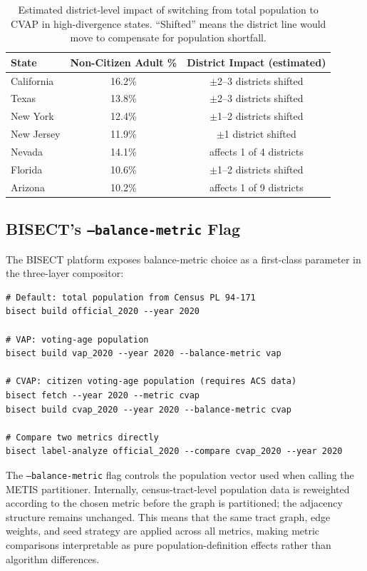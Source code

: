 \begin{table}[h]
\centering
\begin{tabular}{lcc}
\toprule
\textbf{State} & \textbf{Non-Citizen Adult \%} & \textbf{District Impact (estimated)} \\
\midrule
California & 16.2\% & $\pm$2--3 districts shifted \\
Texas & 13.8\% & $\pm$2--3 districts shifted \\
New York & 12.4\% & $\pm$1--2 districts shifted \\
New Jersey & 11.9\% & $\pm$1 district shifted \\
Nevada & 14.1\% & affects 1 of 4 districts \\
Florida & 10.6\% & $\pm$1--2 districts shifted \\
Arizona & 10.2\% & affects 1 of 9 districts \\
\bottomrule
\end{tabular}
\caption{Estimated district-level impact of switching from total population to CVAP in high-divergence states. ``Shifted'' means the district line would move to compensate for population shortfall.}
\label{tab:district-impact}
\end{table}

\subsection{BISECT's \texttt{--balance-metric} Flag}

The BISECT platform exposes balance-metric choice as a first-class parameter in the three-layer compositor:

\begin{verbatim}
# Default: total population from Census PL 94-171
bisect build official_2020 --year 2020

# VAP: voting-age population
bisect build vap_2020 --year 2020 --balance-metric vap

# CVAP: citizen voting-age population (requires ACS data)
bisect fetch --year 2020 --metric cvap
bisect build cvap_2020 --year 2020 --balance-metric cvap

# Compare two metrics directly
bisect label-analyze official_2020 --compare cvap_2020 --year 2020
\end{verbatim}

The \texttt{--balance-metric} flag controls the population vector used when calling the METIS partitioner. Internally, census-tract-level population data is reweighted according to the chosen metric before the graph is partitioned; the adjacency structure remains unchanged. This means that the same tract graph, edge weights, and seed strategy are applied across all metrics, making metric comparisons interpretable as pure population-definition effects rather than algorithm differences.

